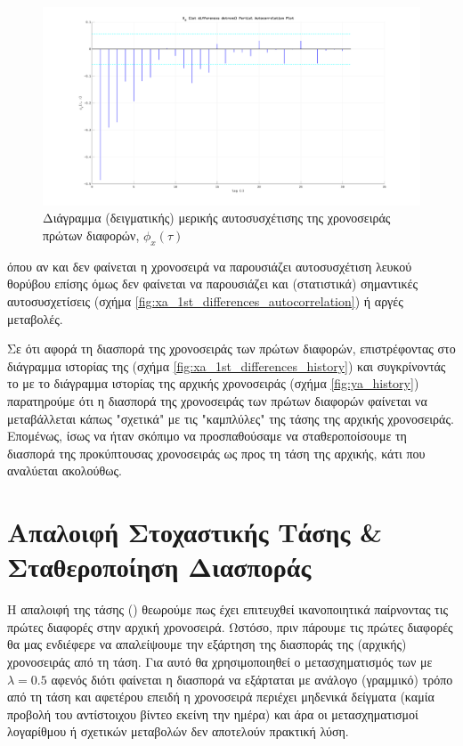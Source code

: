 \begin{figure}[H]
    \begin{center}
        \includegraphics[width=\textwidth]{plots/xa_1st_differences_partial_autocorrelation.svg.pdf}
        \caption{Διάγραμμα (δειγματικής) μερικής αυτοσυσχέτισης της χρονοσειράς πρώτων διαφορών, $\phi_x(\tau)$}
        \label{fig:xa_1st_differences_partial_autocorrelation}
    \end{center}
\end{figure}

όπου αν και δεν φαίνεται η χρονοσειρά να παρουσιάζει αυτοσυσχέτιση λευκού θορύβου επίσης όμως δεν φαίνεται να παρουσιάζει και (στατιστικά) σημαντικές αυτοσυσχετίσεις (σχήμα \ref{fig:xa_1st_differences_autocorrelation}) ή αργές μεταβολές. 

Σε ότι αφορά τη διασπορά της χρονοσειράς των πρώτων διαφορών, επιστρέφοντας στο διάγραμμα ιστορίας της (σχήμα \ref{fig:xa_1st_differences_history}) και συγκρίνοντάς το με το διάγραμμα ιστορίας της αρχικής χρονοσειράς (σχήμα \ref{fig:ya_history}) παρατηρούμε ότι η διασπορά της χρονοσειράς των πρώτων διαφορών φαίνεται να μεταβάλλεται κάπως "σχετικά" με τις "καμπλύλες" της τάσης της αρχικής χρονοσειράς. Επομένως, ίσως να ήταν σκόπιμο να προσπαθούσαμε να σταθεροποίσουμε τη διασπορά της προκύπτουσας χρονοσειράς ως προς τη τάση της αρχικής, κάτι που αναλύεται ακολούθως.

\section{Απαλοιφή Στοχαστικής Τάσης \& Σταθεροποίηση Διασποράς}

Η απαλοιφή της τάσης () θεωρούμε πως έχει επιτευχθεί ικανοποιητικά παίρνοντας τις πρώτες διαφορές στην αρχική χρονοσειρά. Ωστόσο, πριν πάρουμε τις πρώτες διαφορές θα μας ενδιέφερε να απαλείψουμε την εξάρτηση της διασποράς της (αρχικής) χρονοσειράς από τη τάση. Για αυτό θα χρησιμοποιηθεί ο μετασχηματισμός των  με $\lambda=0.5$ αφενός διότι φαίνεται η διασπορά να εξάρταται με ανάλογο (γραμμικό) τρόπο από τη τάση και αφετέρου επειδή η χρονοσειρά περιέχει μηδενικά δείγματα (καμία προβολή του αντίστοιχου βίντεο εκείνη την ημέρα) και άρα οι μετασχηματισμοί λογαρίθμου ή σχετικών μεταβολών δεν αποτελούν πρακτική λύση.

